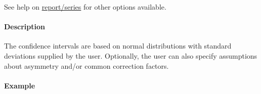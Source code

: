  See help on \url{report/series} for other options available.
 
 \paragraph{Description}
 
 The confidence intervals are based on normal distributions with standard
 deviations supplied by the user. Optionally, the user can also specify
 assumptions about asymmetry and/or common correction factors.
 
 \paragraph{Example}


